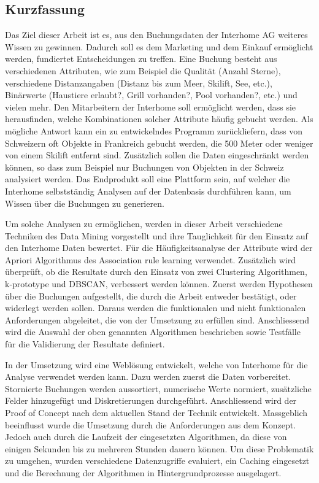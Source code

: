 
\subsection*{Kurzfassung}
Das Ziel dieser Arbeit ist es, aus den Buchungsdaten der Interhome AG weiteres Wissen zu gewinnen. Dadurch soll es dem Marketing und dem Einkauf ermöglicht werden, fundiertet Entscheidungen zu treffen. Eine Buchung besteht aus verschiedenen Attributen, wie zum Beispiel die Qualität (Anzahl Sterne), verschiedene Distanzangaben (Distanz bis zum Meer, Skilift, See, etc.), Binärwerte (Haustiere erlaubt?, Grill vorhanden?, Pool vorhanden?, etc.) und vielen mehr. Den Mitarbeitern der Interhome soll ermöglicht werden, dass sie herausfinden, welche Kombinationen solcher Attribute häufig gebucht werden. Als mögliche Antwort kann ein zu entwickelndes Programm zurückliefern, dass von Schweizern oft Objekte in Frankreich gebucht werden, die 500 Meter oder weniger von einem Skilift entfernt sind. Zusätzlich sollen die Daten eingeschränkt werden können, so dass zum Beispiel nur Buchungen von Objekten in der Schweiz analysiert werden. Das Endprodukt soll eine Plattform sein, auf welcher die Interhome selbstständig Analysen auf der Datenbasis durchführen kann, um Wissen über die Buchungen zu generieren.

Um solche Analysen zu ermöglichen, werden in dieser Arbeit verschiedene Techniken des Data Mining vorgestellt und ihre Tauglichkeit für den Einsatz auf den Interhome Daten bewertet. Für die Häufigkeitsanalyse der Attribute wird der Apriori Algorithmus des Association rule learning verwendet. Zusätzlich wird überprüft, ob die Resultate durch den Einsatz von zwei Clustering Algorithmen, k-prototype und DBSCAN, verbessert werden können. Zuerst werden Hypothesen über die Buchungen aufgestellt, die durch die Arbeit entweder bestätigt, oder widerlegt werden sollen. Daraus werden die funktionalen und nicht funktionalen Anforderungen abgeleitet, die von der Umsetzung zu erfüllen sind. Anschliessend wird die Auswahl der oben genannten Algorithmen beschrieben sowie Testfälle für die Validierung der Resultate definiert.  

In der Umsetzung wird eine Weblösung entwickelt, welche von Interhome für die Analyse verwendet werden kann. Dazu werden zuerst die Daten vorbereitet. Stornierte Buchungen werden aussortiert, numerische Werte normiert, zusätzliche Felder hinzugefügt und Diskretierungen durchgeführt. Anschliessend wird der Proof of Concept nach dem aktuellen Stand der Technik entwickelt. Massgeblich beeinflusst wurde die Umsetzung durch die Anforderungen aus dem Konzept. Jedoch auch durch die Laufzeit der eingesetzten Algorithmen, da diese von einigen Sekunden bis zu mehreren Stunden dauern können. Um diese Problematik zu umgehen, wurden verschiedene Datenzugriffe evaluiert, ein Caching eingesetzt und die Berechnung der Algorithmen in Hintergrundprozesse ausgelagert.

